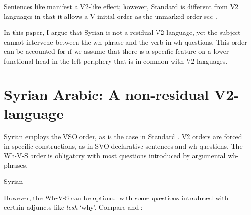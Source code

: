 \documentclass[output=paper]{LSP/langsci}
\begin{document}
Sentences like  manifest a V2-like effect; however, Standard  is different from V2 languages in that it allows a V-initial order as the unmarked order see \citet[27ff]{Fassi1993}.

In this paper, I argue that Syrian  is not a residual V2 language, yet the subject cannot intervene between the wh-phrase and the verb in wh-questions. This order can be accounted for if we assume that there is a specific feature on a lower functional head in the left periphery that is in common with V2 languages.




\section{Syrian Arabic: A non-residual V2-language}


Syrian  employs the VSO order, as is the case in Standard . V2 orders are forced in specific constructions, as in SVO declarative sentences and wh-questions. The Wh-V-S order is obligatory with most questions introduced by argumental wh-phrases.

\ea%
\label{ex:sulaiman:4}
Syrian  \citep[32]{Sulaiman2016}



\z
\z

\ea%
\label{ex:sulaiman:5}


 \z
 \z

However, the Wh-V-S can be optional with some questions introduced with certain adjuncts like \textit{lesh} ‘why’. Compare  and :
\end{document}
